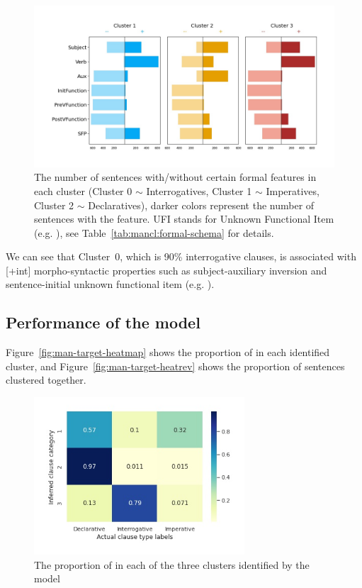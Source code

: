 \begin{figure}[H]
    \centering
    \includegraphics[width=1\textwidth]{figures/man-baseline-conservative-syncluster.jpg}
    \caption{The number of sentences with/without certain formal features in each cluster (Cluster 0 $\sim$ Interrogatives, Cluster 1 $\sim$ Imperatives, Cluster 2 $\sim$ Declaratives), darker colors represent the number of sentences with the feature. UFI stands for Unknown Functional Item (e.g. \twh{}), see Table~\ref{tab:mancl:formal-schema} for details.}
    \label{fig:man-baseline-syncluster}
\end{figure}

We can see that Cluster~$0$, which is 90\% interrogative clauses, is associated with [+int] morpho-syntactic properties such as subject-auxiliary inversion and sentence-initial unknown functional item (e.g. \twh{}).

\subsection{Performance of the \plearnerabbr{} model}
\label{sec:mancl:model:results:d}

Figure~\ref{fig:man-target-heatmap} shows the proportion of \diis{} in each identified cluster, and Figure~\ref{fig:man-target-heatrev} shows the proportion of sentences clustered together. 
\begin{figure}[H]
    \centering
    \includegraphics[width=0.7\textwidth]{figures/man-target-conservative-heatmap.jpg}
    \caption{The proportion of \diis{} in each of the three clusters identified by the \plearnerabbr{} model}
    \label{fig:man-target-conservative-heatmap}
\end{figure}




